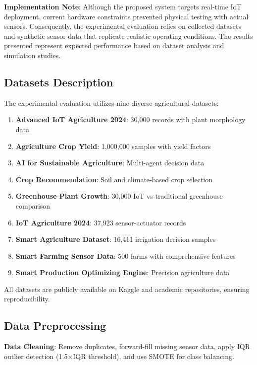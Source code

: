 \documentclass[conference]{IEEEtran}
\begin{document}
\textbf{Implementation Note}: Although the proposed system targets real-time IoT deployment, current hardware constraints prevented physical testing with actual sensors. Consequently, the experimental evaluation relies on collected datasets and synthetic sensor data that replicate realistic operating conditions. The results presented represent expected performance based on dataset analysis and simulation studies.

\subsection{Datasets Description}

The experimental evaluation utilizes nine diverse agricultural datasets:

\begin{enumerate}
\item \textbf{Advanced IoT Agriculture 2024}: 30,000 records with plant morphology data
\item \textbf{Agriculture Crop Yield}: 1,000,000 samples with yield factors
\item \textbf{AI for Sustainable Agriculture}: Multi-agent decision data
\item \textbf{Crop Recommendation}: Soil and climate-based crop selection
\item \textbf{Greenhouse Plant Growth}: 30,000 IoT vs traditional greenhouse comparison
\item \textbf{IoT Agriculture 2024}: 37,923 sensor-actuator records
\item \textbf{Smart Agriculture Dataset}: 16,411 irrigation decision samples
\item \textbf{Smart Farming Sensor Data}: 500 farms with comprehensive features
\item \textbf{Smart Production Optimizing Engine}: Precision agriculture data
\end{enumerate}

All datasets are publicly available on Kaggle and academic repositories, ensuring reproducibility.

\subsection{Data Preprocessing}

\textbf{Data Cleaning}: Remove duplicates, forward-fill missing sensor data, apply IQR outlier detection (1.5$\times$IQR threshold), and use SMOTE for class balancing.
\end{document}

